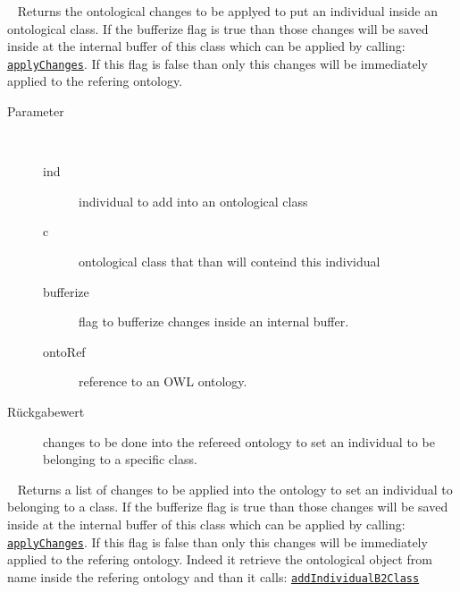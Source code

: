 \begin{description}
~ Returns the ontological changes to be applyed to put an 
 individual inside an ontological class.
 If the bufferize flag is true than those changes will be saved inside at the
 internal buffer of this class which can be applied by calling:
 \texttt{\hyperlink{ontologyFramework.OFContextManagement.OWLLibrary.applyChanges(ontologyFramework.OFContextManagement.OWLReferences)}{applyChanges}}. If this flag is false than only this
 changes will be immediately applied to the refering ontology.
\begin{description}
\item[Parameter] ~
\begin{description}
\item[ind]
individual to add into an ontological class
\item[c]
ontological class that than will conteind this individual
\item[bufferize]
flag to bufferize changes inside an internal buffer.
\item[ontoRef]
reference to an OWL ontology.
\end{description}
\item[Rückgabewert] 
changes to be done into the refereed ontology to set an individual to be belonging to a specific class.
\end{description}
\item[{\ltdHypertarget{ontologyFramework.OFContextManagement.OWLLibrary.addIndividualB2Class(java.lang.String,java.lang.String,boolean,ontologyFramework.OFContextManagement.OWLReferences)}{addIndividualB2Class}\label{ontologyFramework.OFContextManagement.OWLLibrary.addIndividualB2Class(java.lang.String,java.lang.String,boolean,ontologyFramework.OFContextManagement.OWLReferences)}}]
~ Returns a list of changes to be applied into the ontology to
 set an individual to belonging to a class.
 If the bufferize flag is true than those changes will be saved inside at the
 internal buffer of this class which can be applied by calling:
 \texttt{\hyperlink{ontologyFramework.OFContextManagement.OWLLibrary.applyChanges(ontologyFramework.OFContextManagement.OWLReferences)}{applyChanges}}. If this flag is false than only this
 changes will be immediately applied to the refering ontology.
 Indeed it retrieve the ontological object from name inside the refering ontology
 and than it calls: 
 \texttt{\hyperlink{ontologyFramework.OFContextManagement.OWLLibrary.addIndividualB2Class(org.semanticweb.owlapi.model.OWLNamedIndividual,org.semanticweb.owlapi.model.OWLClass,boolean,ontologyFramework.OFContextManagement.OWLReferences)}{addIndividualB2Class}}

\end{description}
